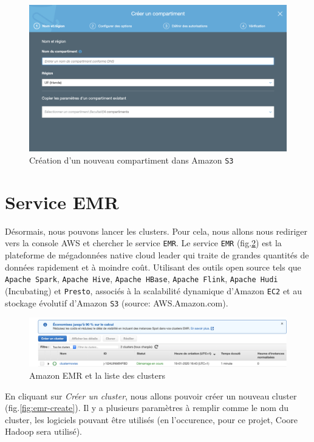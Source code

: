 \documentclass[a4paper, 12pt, oneside]{book}
\begin{document}
\begin{figure}[H]
  \centering
  \includegraphics[width=1.0\textwidth]{images/s3-compartiment}
  \caption{Création d'un nouveau compartiment dans Amazon \texttt{S3}}
  \label{fig:s3-compartiment}
\end{figure}


\section{Service EMR}
Désormais, nous pouvons lancer les clusters. Pour cela, nous allons nous rediriger vers la console AWS et chercher le service \texttt{EMR}. Le service \texttt{EMR} (fig.\ref{fig:emr-home}) est la plateforme de mégadonnées native cloud leader qui traite de grandes quantités de données rapidement et à moindre coût. Utilisant des outils open source tels que \texttt{Apache Spark}, \texttt{Apache Hive}, \texttt{Apache HBase}, \texttt{Apache Flink}, \texttt{Apache Hudi} (Incubating) et \texttt{Presto}, associés à la scalabilité dynamique d'Amazon \texttt{EC2} et au stockage évolutif d'Amazon \texttt{S3} (source: AWS.Amazon.com).

\begin{figure}[H]
  \centering
  \includegraphics[width=1.0\textwidth]{images/emr-home}
  \caption{Amazon EMR et la liste des clusters}
  \label{fig:emr-home}
\end{figure}

En cliquant sur \textit{Créer un cluster}, nous allons pouvoir créer un nouveau cluster (fig.\ref{fig:emr-create}). Il y a plusieurs paramètres à remplir comme le nom du cluster, les logiciels pouvant être utilisés (en l'occurence, pour ce projet, Coore Hadoop sera utilisé). 
\end{document}
